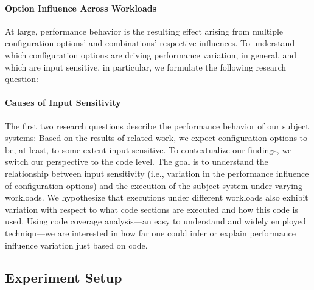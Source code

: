 
\paragraph{Option Influence Across Workloads}
At large, performance behavior is the resulting effect arising from multiple configuration options’ and combinations’ respective influences. To understand which configuration options are driving performance variation, in general, and which are input sensitive, in particular, we formulate the following research question:


\paragraph{Causes of Input Sensitivity}
The first two research questions describe the performance behavior of our subject systems: Based on the results of related work, we expect configuration options to be, at least, to some extent input sensitive. To contextualize our findings, we switch our perspective to the code level. The goal is to understand the relationship between input sensitivity (i.e., variation in the performance influence of configuration options) and the execution of the subject system under varying workloads. We hypothesize that executions under different workloads also exhibit variation with respect to what code sections are executed and how this code is used. Using code coverage analysis---an easy to understand and widely employed techniqu---we are interested in how far one could infer or explain performance influence variation just based on code. 


\subsection{Experiment Setup}\label{sec:setup}
